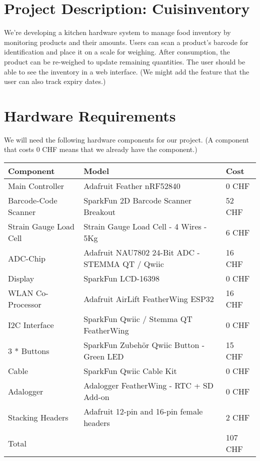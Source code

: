 \documentclass{article} %
\begin{document}
\section*{Project Description: Cuisinventory}
We're developing a kitchen hardware system to manage food inventory by monitoring products and their amounts.
Users can scan a product's barcode for identification and place it on a scale for weighing.
After consumption, the product can be re-weighed to update remaining quantities.
The user should be able to see the inventory in a web interface.
(We might add the feature that the user can also track expiry dates.)


\section*{Hardware Requirements}
We will need the following hardware components for our project.
(A component that costs 0 CHF means that we already have the component.)

\begin{tabular}{l l l}
	\hline
	Component              & Model                                           & Cost    \\
	\hline
	Main Controller        & Adafruit Feather nRF52840                       & 0 CHF   \\
	Barcode-Code Scanner   & SparkFun 2D Barcode Scanner Breakout            & 52 CHF  \\
	Strain Gauge Load Cell & Strain Gauge Load Cell - 4 Wires - 5Kg          & 6 CHF   \\
	ADC-Chip               & Adafruit NAU7802 24-Bit ADC - STEMMA QT / Qwiic & 16 CHF  \\
	Display                & SparkFun LCD-16398                              & 0 CHF   \\
	WLAN Co-Processor      & Adafruit AirLift FeatherWing ESP32              & 16 CHF  \\
	I2C Interface          & SparkFun Qwiic / Stemma QT FeatherWing          & 0 CHF   \\
	3 * Buttons            & SparkFun Zubehör Qwiic Button - Green LED       & 15 CHF  \\
	Cable                  & SparkFun Qwiic Cable Kit                        & 0 CHF   \\
	Adalogger              & Adalogger FeatherWing - RTC + SD Add-on         & 0 CHF   \\
	Stacking Headers       & Adafruit 12-pin and 16-pin female headers       & 2 CHF   \\
	\hline
	Total                  &                                                 & 107 CHF \\
	\hline
\end{tabular}
\end{document}
